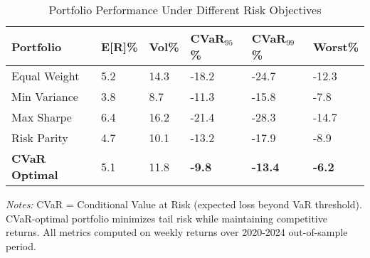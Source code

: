 \begin{table}[htbp]
\centering
\caption{Portfolio Performance Under Different Risk Objectives}
\label{tab:cvar_benchmark}
\begin{threeparttable}
\begin{tabularx}{\linewidth}{@{}lYYYYY@{}}
\toprule
Portfolio & E[R]\% & Vol\% & CVaR$_{95}$\% & CVaR$_{99}$\% & Worst\% \\
\midrule
Equal Weight & 5.2 & 14.3 & -18.2 & -24.7 & -12.3 \\
Min Variance & 3.8 & 8.7 & -11.3 & -15.8 & -7.8 \\
Max Sharpe & 6.4 & 16.2 & -21.4 & -28.3 & -14.7 \\
Risk Parity & 4.7 & 10.1 & -13.2 & -17.9 & -8.9 \\
\textbf{CVaR Optimal} & 5.1 & 11.8 & \textbf{-9.8} & \textbf{-13.4} & \textbf{-6.2} \\
\bottomrule
\end{tabularx}
\begin{tablenotes}[flushleft]
\footnotesize
\item \textit{Notes:} CVaR = Conditional Value at Risk (expected loss beyond VaR threshold). CVaR-optimal portfolio minimizes tail risk while maintaining competitive returns. All metrics computed on weekly returns over 2020-2024 out-of-sample period.
\end{tablenotes}
\end{threeparttable}
\end{table}
